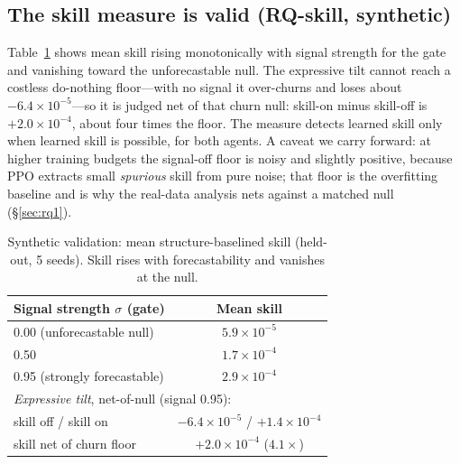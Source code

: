 \documentclass[sigconf,anonymous,review]{acmart}
\begin{document}
\subsection{The skill measure is valid (RQ-skill, synthetic)}
Table~\ref{tab:rq2} shows mean skill rising monotonically with signal strength for
the gate and vanishing toward the unforecastable null. The expressive tilt cannot
reach a costless do-nothing floor---with no signal it over-churns and loses about
$-6.4\times10^{-5}$---so it is judged net of that churn null: skill-on minus
skill-off is $+2.0\times10^{-4}$, about four times the floor. The measure detects
learned skill only when learned skill is possible, for both agents. A caveat we
carry forward: at higher training budgets the signal-off floor is noisy and slightly
positive, because PPO extracts small \emph{spurious} skill from pure noise; that
floor is the overfitting baseline and is why the real-data analysis nets against a
matched null (\S\ref{sec:rq1}).

\begin{table}[t]
  \caption{Synthetic validation: mean structure-baselined skill (held-out, 5 seeds).
  Skill rises with forecastability and vanishes at the null.}
  \label{tab:rq2}
  \small
  \begin{tabular}{lc}
    \toprule
    Signal strength $\sigma$ (gate) & Mean skill \\
    \midrule
    0.00 (unforecastable null)   & $5.9\times10^{-5}$ \\
    0.50                         & $1.7\times10^{-4}$ \\
    0.95 (strongly forecastable) & $2.9\times10^{-4}$ \\
    \midrule
    \multicolumn{2}{l}{\emph{Expressive tilt}, net-of-null (signal 0.95):}\\
    \quad skill off / skill on            & $-6.4\times10^{-5}$ / $+1.4\times10^{-4}$\\
    \quad skill net of churn floor        & $+2.0\times10^{-4}$ ($4.1\times$)\\
    \bottomrule
  \end{tabular}
\end{table}
\end{document}
